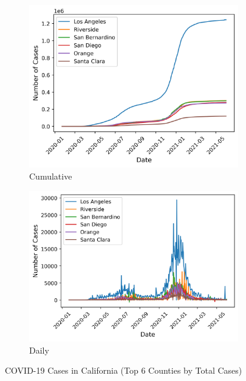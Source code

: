 \documentclass{article}
\begin{document}
\begin{figure}[hbt!]
    \centering
    \begin{subfigure}[b]{0.48\textwidth}
        \centering
        \includegraphics[width=\textwidth]{images/covid_cases_ca_county_cumulative.png}
        \caption{Cumulative}
        \label{fig:traffic-eda-cumulative}
    \end{subfigure}
    \hfill
    \begin{subfigure}[b]{0.48\textwidth}
        \centering
        \includegraphics[width=\textwidth]{images/covid_cases_ca_county_daily.png}
        \caption{Daily}
        \label{fig:covid-eda-daily}
    \end{subfigure}
    \caption{COVID-19 Cases in California (Top 6 Counties by Total Cases)}
    \label{fig:covid-eda}
\end{figure}
\end{document}
